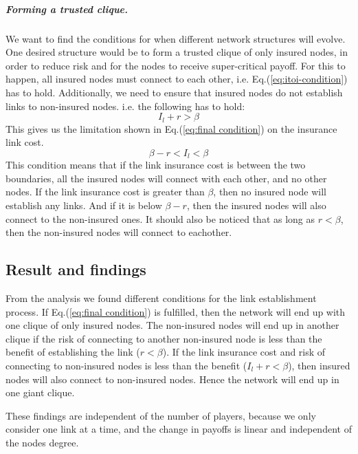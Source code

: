 \subparagraph{Forming a trusted clique.}
We want to find the conditions for when different network structures will evolve. One desired structure would be to form a trusted clique of only insured nodes, in order to reduce risk and for the nodes to receive super-critical payoff. For this to happen, all insured nodes must connect to each other, i.e. Eq.(\ref{eq:itoi-condition}) has to hold. Additionally, we need to ensure that insured nodes do not establish links to non-insured nodes. i.e. the following has to hold:
\begin{equation}
I_{l}+r>\beta
\end{equation}
This gives us the limitation shown in Eq.(\ref{eq:final condition}) on the insurance link cost.
\begin{equation}
\beta-r<I_{l}<\beta
\label{eq:final condition}
\end{equation}
This condition means that if the link insurance cost is between the two boundaries, all the insured nodes will connect with each other, and no other nodes. If the link insurance cost is greater than $\beta$, then no insured node will establish any links. And if it is below $\beta-r$, then the insured nodes will also connect to the non-insured ones.
It should also be noticed that as long as $r<\beta$, then the non-insured nodes will connect to eachother. 

\subsection{Result and findings}
From the analysis we found different conditions for the link establishment process. If Eq.(\ref{eq:final condition}) is fulfilled, then the network will end up with one clique of only insured nodes. The non-insured nodes will end up in another clique if the risk of connecting to another non-insured node is less than the benefit of establishing the link ($r<\beta$).
If the link insurance cost and risk of connecting to non-insured nodes is less than the benefit ($I_{l}+r<\beta$), then insured nodes will also connect to non-insured nodes. Hence the network will end up in one giant clique.

These findings are independent of the number of players, because we only consider one link at a time, and the change in payoffs is linear and independent of the nodes degree.

